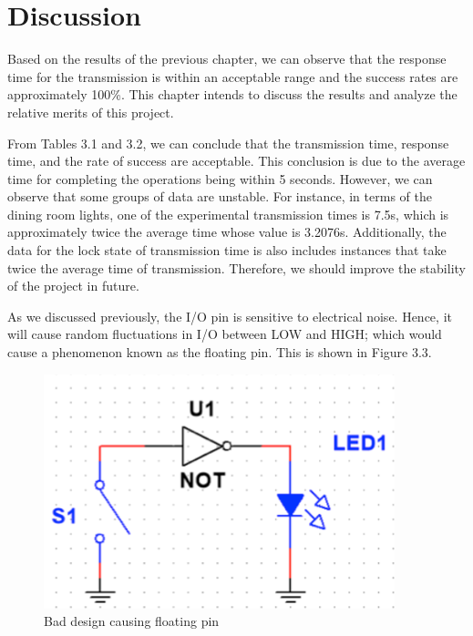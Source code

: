 \documentclass[12pt,a4paper]{report}
\begin{document}
\vspace{10cm}
\section{Discussion}

Based on the results of the previous chapter, we can observe that the response time for the transmission is within an acceptable range and the success rates are approximately 100\%. This chapter intends to discuss the results and analyze the relative merits of this project. 

\vspace{0.2cm}

\noindent From Tables 3.1 and 3.2, we can conclude that the transmission time, response time, and the rate of success are acceptable. This conclusion is due to the average time for completing the operations being within 5 seconds. However, we can observe that some groups of data are unstable. For instance, in terms of the dining room lights, one of the experimental transmission times is 7.5s, which is approximately twice the average time whose value is 3.2076s. Additionally, the data for the lock state of transmission time is also includes instances that take twice the average time of transmission. Therefore, we should improve the stability of the project in future. 

\vspace{0.2cm}

\noindent As we discussed previously, the I/O pin is sensitive to electrical noise. Hence, it will cause random fluctuations in I/O between LOW and HIGH; which would cause a phenomenon known as the floating pin. This is shown in Figure 3.3. 

\begin{figure}[H]
	\centering
	\includegraphics[scale= 1]{figures/badFP.png}
	\caption{Bad design causing floating pin}
\end{figure}
\end{document}
